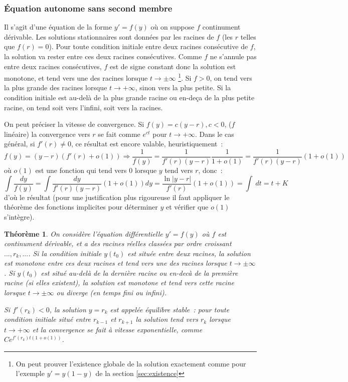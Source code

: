 \documentclass[a4paper,11pt]{article}
\newtheorem{thm}{Théorème}
\begin{document}
\subsubsection{\'Equation autonome sans second membre}
Il s'agit d'une \'equation de la forme $y'=f(y)$ o\`u on
suppose $f$ continument d\'erivable. Les solutions
stationnaires sont donn\'ees par les racines de $f$ (les
$r$ telles que $f(r)=0$). Pour toute condition initiale entre
deux racines cons\'ecutive de $f$, la solution va rester entre
ces deux racines cons\'ecutives. Comme $f$ ne s'annule pas
entre deux racines cons\'ecutives, $f$ est de signe constant
donc la solution est monotone,
et tend vers une des racines lorsque $t \rightarrow \pm \infty$
\footnote{On peut prouver l'existence globale de la solution
exactement comme pour l'exemple $y'=y(1-y)$ de la section 
\ref{sec:existence}}.
Si $f>0$, on tend vers la plus grande des racines lorsque $t
\rightarrow +\infty$, sinon vers la plus petite. Si la condition 
initiale est au-del\`a de la plus grande racine ou en-de\c{c}a
de la plus petite racine, on tend soit vers l'infini, soit vers la racines.

On peut pr\'eciser
la vitesse de convergence. Si $f(y)=c(y-r), c<0$, ($f$ lin\'eaire)
la convergence vers $r$ se fait comme $e^{ct}$ pour $t \rightarrow
+\infty$. Dans le cas
g\'en\'eral, si $f'(r) \neq 0$, 
ce r\'esultat est encore valable, heuristiquement~:
$$ f(y)=(y-r)(f'(r)+o(1)) \Rightarrow \frac{1}{f(y)}=
\frac{1}{f'(r)(y-r)} \frac{1}{1+o(1)}
=\frac{1}{f'(r)(y-r)}(1 + o(1))$$
o\`u $o(1)$ est une fonction qui tend vers 0 lorsque $y$ tend vers
$r$, donc~:
$$ \int \frac{dy}{f(y)} = \int \frac{dy}{f'(r)(y-r)}(1 + o(1)) dy 
= \frac{\ln|y-r|}{f'(r)} (1 + o(1)) = \int \ dt = t+K  $$
d'o\`u le r\'esultat (pour une justification plus rigoureuse
il faut appliquer le th\'eor\`eme des fonctions implicites
pour d\'eterminer $y$ et v\'erifier que $o(1)$ s'int\`egre).

\begin{thm}
On consid\`ere l'\'equation diff\'erentielle $y'=f(y)$ o\`u
$f$ est continument d\'erivable, et a des racines r\'eelles
class\'ees par ordre croissant $...,r_k,...$. Si la condition
initiale $y(t_0)$ est
situ\'ee entre deux racines, la solution est monotone entre
ces deux racines et tend vers une des racines lorsque $t\rightarrow
\pm \infty$. Si $y(t_0)$ est situ\'e au-del\`a de la derni\`ere racine
ou en-dec\`a de la premi\`ere racine (si elles existent), 
la solution est monotone et
tend vers cette racine lorsque $t\rightarrow \pm \infty$
ou diverge (en temps fini ou infini).

Si $f'(r_k) < 0$, la solution $y=r_k$ est appel\'ee \'equilibre
stable~: pour toute condition initiale situ\'e entre $r_{k-1}$ et $r_{k+1}$
la solution tend vers $r_k$ lorsque $t \rightarrow +\infty$ 
et la convergence se fait \`a vitesse
exponentielle, comme $Ce^{f'(r_k)t(1+o(1))}$.
\end{thm}
\end{document}
